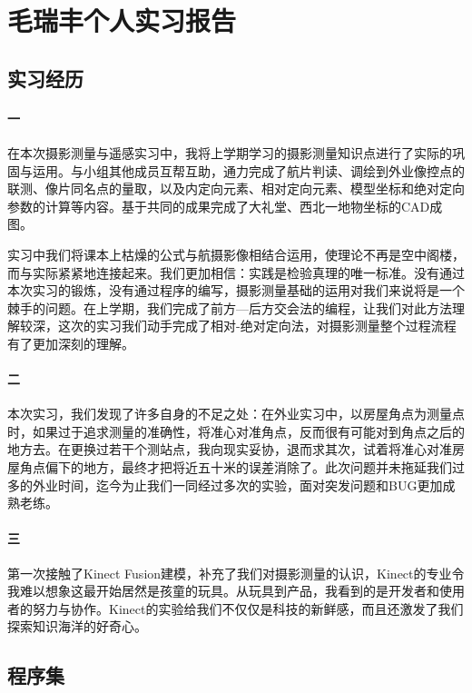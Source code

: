 \chapter{毛瑞丰个人实习报告}


\section{实习经历}


\subsubsection{一}
在本次摄影测量与遥感实习中，我将上学期学习的摄影测量知识点进行了实际的巩固与运用。与小组其他成员互帮互助，通力完成了航片判读、调绘到外业像控点的联测、像片同名点的量取，以及内定向元素、相对定向元素、模型坐标和绝对定向参数的计算等内容。基于共同的成果完成了大礼堂、西北一地物坐标的CAD成图。

实习中我们将课本上枯燥的公式与航摄影像相结合运用，使理论不再是空中阁楼，而与实际紧紧地连接起来。我们更加相信：实践是检验真理的唯一标准。没有通过本次实习的锻炼，没有通过程序的编写，摄影测量基础的运用对我们来说将是一个棘手的问题。在上学期，我们完成了前方—后方交会法的编程，让我们对此方法理解较深，这次的实习我们动手完成了相对-绝对定向法，对摄影测量整个过程流程有了更加深刻的理解。

\subsubsection{二}
本次实习，我们发现了许多自身的不足之处：在外业实习中，以房屋角点为测量点时，如果过于追求测量的准确性，将准心对准角点，反而很有可能对到角点之后的地方去。在更换过若干个测站点，我向现实妥协，退而求其次，试着将准心对准房屋角点偏下的地方，最终才把将近五十米的误差消除了。此次问题并未拖延我们过多的外业时间，迄今为止我们一同经过多次的实验，面对突发问题和BUG更加成熟老练。

\subsubsection{三}
第一次接触了Kinect Fusion建模，补充了我们对摄影测量的认识，Kinect的专业令我难以想象这最开始居然是孩童的玩具。从玩具到产品，我看到的是开发者和使用者的努力与协作。Kinect的实验给我们不仅仅是科技的新鲜感，而且还激发了我们探索知识海洋的好奇心。

\section{程序集}

